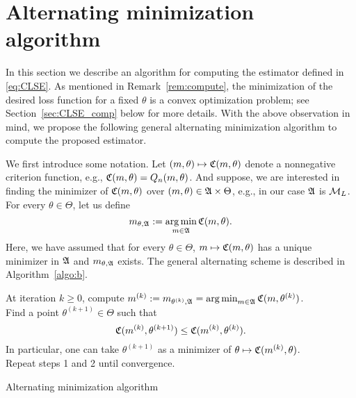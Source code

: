 \section{Alternating minimization algorithm}\label{sec:compute}
In this section we describe an algorithm for computing the estimator defined in \eqref{eq:CLSE}.  As mentioned in Remark~\ref{rem:compute}, the minimization of the desired loss function for a fixed $\theta$ is a convex optimization problem; see Section~\ref{sec:CLSE_comp} below for more details. With the above observation in mind, we propose the following general alternating minimization algorithm to compute the proposed estimator. \fi {}\fi 

We first introduce some notation. Let $(m, \theta)\mapsto \mathfrak{C}(m, \theta)$ denote a nonnegative criterion function, e.g., $\mathfrak{C}(m, \theta) = Q_n(m, \theta)$. And suppose, we are interested in finding the minimizer of $\mathfrak{C}(m, \theta)$ over $(m, \theta) \in \mathfrak{A}\times \Theta$, e.g., in our case $\mathfrak{A}$ is $\mathcal{M}_L$. For every $\theta \in \Theta$, let us define
 \begin{equation} \label{eq:profile}
  m_{\theta, \mathfrak{A}}:= \operatorname*{arg\,min}_{m \in \mathfrak{A}} \mathfrak{C}(m,\theta).
 \end{equation}
 Here, we have  assumed that for every $\theta \in \Theta$, $m \mapsto \mathfrak{C}(m, \theta)$ has a unique minimizer in $\mathfrak{A}$ and $m_{\theta, \mathfrak{A}}$ exists. The general alternating scheme is described in Algorithm~\ref{algo:b}.
 \begin{algorithm}
At iteration $k \ge 0$, compute $m^{(k)} := m_{\theta^{(k)},\mathfrak{A}} =  \operatorname*{arg\,min}_{m \in \mathfrak{A}} \mathfrak{C}(m,\theta^{(k)})$.\\
Find a point $\theta^{(k+1)}\in\Theta$ such that
\[
\mathfrak{C}(m^{(k)}, \theta^{(k+1)}) \le \mathfrak{C}(m^{(k)}, \theta^{(k)}).
\]
In particular, one can take $\theta^{(k+1)}$ as a minimizer of $\theta\mapsto\mathfrak{C}(m^{(k)}, \theta)$.\\
Repeat steps 1 and 2 until convergence.
\caption{Alternating minimization algorithm}
\label{algo:b}
\end{algorithm}

